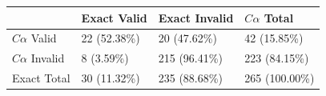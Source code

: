 \begin{tabular}{llll}
\toprule
 & Exact Valid & Exact Invalid & $C\alpha$ Total \\
\midrule
$C\alpha$ Valid & 22 (52.38\%) & 20 (47.62\%) & 42 (15.85\%) \\
$C\alpha$ Invalid & 8 (3.59\%) & 215 (96.41\%) & 223 (84.15\%) \\
Exact Total & 30 (11.32\%) & 235 (88.68\%) & 265 (100.00\%) \\
\bottomrule
\end{tabular}
